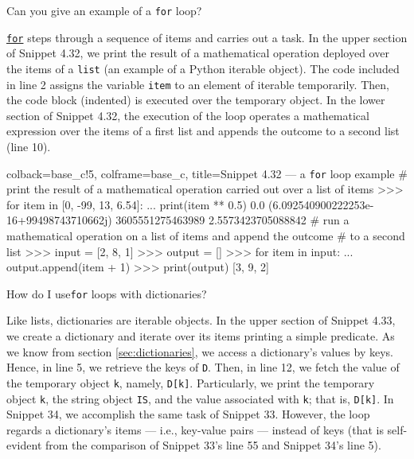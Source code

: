 \documentclass[a4paper,11pt]{book}
\newcommand{\question}[1]{%
    \begin{tcolorbox}[colback=comp_c!10,colframe=comp_c,sidebyside align=top,width=\linewidth,before skip=1ex]
        #1
    \end{tcolorbox}
    \switchcolumn%
}
\newcommand{\note}[1]{%
    \begin{tcolorbox}[colback=white!0,colframe=white!10,width=\linewidth,before skip=1ex]
        #1
    \end{tcolorbox}
}
\begin{document}
\begin{paracol}{2}
	\question{\raggedright Can you give an example of a \texttt{for} loop?}
	\note{\href{https://docs.python.org/3/reference/compound_stmts.html\#for}{\texttt{for}} steps through a sequence of items and carries out a task. In the upper section of Snippet 4.32, we print the result of a mathematical operation deployed over the items of a \texttt{list} (an example of a Python iterable object). The code included in line 2 assigns the variable \texttt{item} to an element of iterable temporarily. Then, the code block (indented) is executed over the temporary object. In the lower section of Snippet 4.32, the execution of the loop operates a mathematical expression over the items of a first list and appends the outcome to a second list (line 10).}
\end{paracol}

\begin{pythoncode}[linenos=true,]{colback=base_c!5, colframe=base_c, title=\sffamily Snippet 4.32 --- a \texttt{for} loop example}
# print the result of a mathematical operation carried out over a list of items
>>> for item in [0, -99, 13, 6.54]:
...     print(item ** 0.5)  
0.0
(6.092540900222253e-16+99498743710662j)
3605551275463989
2.5573423705088842   
# run a mathematical operation on a list of items and append the outcome 
# to a second list 
>>> input = [2, 8, 1]
>>> output = []
>>> for item in input:
...    output.append(item + 1)
>>> print(output)
[3, 9, 2]
\end{pythoncode}
\clearpage
	
\begin{paracol}{2}
	\question{\raggedright How do I use\texttt{for} loops with dictionaries?}
	\note{Like lists, dictionaries are iterable objects. In the upper section of Snippet 4.33, we create a dictionary and iterate over its items printing a simple predicate. As we know from section \ref{sec:dictionaries}, we access a dictionary's values by keys. Hence, in line 5, we retrieve the keys of \texttt{D}. Then, in line 12, we fetch the value of the temporary object \texttt{k}, namely, \texttt{D[k]}. Particularly, we print the temporary object \texttt{k}, the string object \texttt{IS}, and the value associated with \texttt{k}; that is, \texttt{D[k]}. In Snippet 34, we accomplish the same task of Snippet 33. However, the loop regards a dictionary's items --- i.e., key-value pairs --- instead of keys (that is self-evident from the comparison of Snippet 33's line 55 and Snippet 34's line 5). }
\end{paracol}
\end{document}
